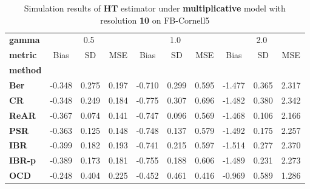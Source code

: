 \begin{table}
\centering
\caption{Simulation results of \textbf{HT} estimator under \textbf{multiplicative} model with resolution \textbf{10} on FB-Cornell5}
\begin{tabular}{lccccccccc}
\toprule
\textbf{gamma} & \multicolumn{3}{c}{0.5} & \multicolumn{3}{c}{1.0} & \multicolumn{3}{c}{2.0} \\
\textbf{metric} &   Bias &     SD &    MSE &   Bias &     SD &    MSE &   Bias &     SD &    MSE \\
\textbf{method} &        &        &        &        &        &        &        &        &        \\
\midrule
\textbf{Ber} & -0.348 &  0.275 &  0.197 & -0.710 &  0.299 &  0.595 & -1.477 &  0.365 &  2.317 \\
\textbf{CR} & -0.348 &  0.249 &  0.184 & -0.775 &  0.307 &  0.696 & -1.482 &  0.380 &  2.342 \\
\textbf{ReAR} & -0.367 &  0.074 &  0.141 & -0.747 &  0.096 &  0.569 & -1.468 &  0.106 &  2.166 \\
\textbf{PSR} & -0.363 &  0.125 &  0.148 & -0.748 &  0.137 &  0.579 & -1.492 &  0.175 &  2.257 \\
\textbf{IBR} & -0.399 &  0.182 &  0.193 & -0.741 &  0.215 &  0.597 & -1.514 &  0.277 &  2.370 \\
\textbf{IBR-p} & -0.389 &  0.173 &  0.181 & -0.755 &  0.188 &  0.606 & -1.489 &  0.231 &  2.273 \\
\textbf{OCD} & -0.248 &  0.404 &  0.225 & -0.452 &  0.461 &  0.416 & -0.969 &  0.589 &  1.286 \\
\bottomrule
\end{tabular}
\end{table}
